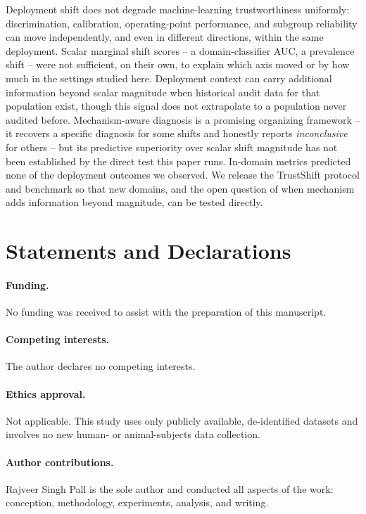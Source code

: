 \documentclass[11pt]{article}
\begin{document}
Deployment shift does not degrade machine-learning trustworthiness uniformly: discrimination,
calibration, operating-point performance, and subgroup reliability can move independently, and even
in different directions, within the same deployment. Scalar marginal shift scores -- a
domain-classifier AUC, a prevalence shift -- were not sufficient, on their own, to explain which
axis moved or by how much in the settings studied here. Deployment context can carry additional
information beyond scalar magnitude when historical audit data for that population exist, though
this signal does not extrapolate to a population never audited before. Mechanism-aware diagnosis is
a promising organizing framework -- it recovers a specific diagnosis for some shifts and honestly
reports \emph{inconclusive} for others -- but its predictive superiority over scalar shift magnitude
has not been established by the direct test this paper runs. In-domain metrics predicted none of
the deployment outcomes we observed. We release the TrustShift protocol and benchmark so that new
domains, and the open question of when mechanism adds information beyond magnitude, can be tested
directly.

\section*{Statements and Declarations}

\paragraph{Funding.} No funding was received to assist with the preparation of this manuscript.

\paragraph{Competing interests.} The author declares no competing interests.

\paragraph{Ethics approval.} Not applicable. This study uses only publicly available, de-identified
datasets and involves no new human- or animal-subjects data collection.

\paragraph{Author contributions.} Rajveer Singh Pall is the sole author and conducted all aspects of
the work: conception, methodology, experiments, analysis, and writing.
\end{document}
